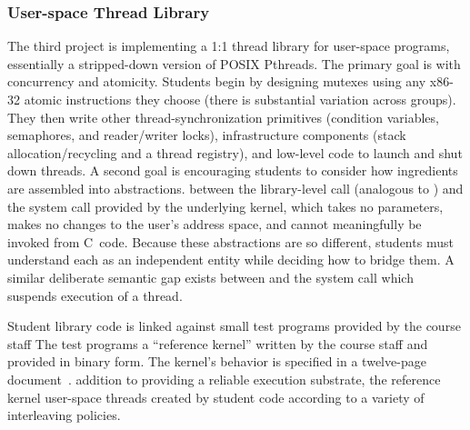 \subsubsection{User-space Thread Library}
The third project is implementing a 1:1 thread library for
user-space programs,
essentially a stripped-down
version of POSIX Pthreads.
The primary goal is
with concurrency and atomicity.
Students begin by designing mutexes using any
x86-32 atomic instructions they choose
(there is substantial variation across groups).
They then write other thread-synchronization
primitives (condition variables, semaphores,
and reader/writer locks), infrastructure
components (stack allocation/recycling and
a thread registry),
and low-level code to launch and shut down
threads.
A second goal is encouraging students to
consider how ingredients are assembled into
abstractions.
between the library-level 
call (analogous to )
and the  system call provided
by the underlying kernel,
which takes no parameters,
makes no changes to the user's address space,
and cannot meaningfully
be invoked from C~code.
Because these abstractions are so different,
students must
understand each as an independent entity while
deciding how to bridge them.
A similar deliberate semantic gap exists between
 and the system call
which suspends execution of a thread.

Student library code is linked against small
test programs provided by the course staff
The test programs  a ``reference kernel'' written by
the course staff
and provided in binary form.
%
The kernel's behavior is specified
in a twelve-page document~\cite{kspec}.
addition to providing a reliable execution
substrate,
the reference kernel
 user-space threads created by
student code according to a variety of
interleaving policies.

